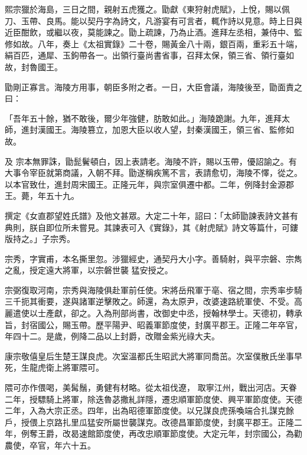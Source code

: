 \begin{pinyinscope}
 熙宗獵於海島，三日之間，親射五虎獲之。勖獻《東狩射虎賦》，上悅，賜以佩
 刀、玉帶、良馬。能以契丹字為詩文，凡游宴有可言者，輒作詩以見意。時上日與近臣酣飲，或繼以夜，莫能諫之。勖上疏諫，乃為止酒。進拜左丞相，兼侍中、監修如故。八年，奏上《太祖實錄》二十卷，賜黃金八十兩，銀百兩，重彩五十端，絹百匹，通犀、玉鉤帶各一。出領行臺尚書省事，召拜太保，領三省、領行臺如故，封魯國王。



 勖剛正寡言。海陵方用事，朝臣多附之者。一日，大臣會議，海陵後至，勖面責之曰：



 「吾年五十餘，猶不敢後，爾少年強健，肪敢如此。」海陵跪謝。九年，進拜太師，進封漢國王。海陵篡立，加恩大臣以收人望，封秦漢國王，領三省、監修如故。



 及
 宗本無罪誅，勖髭鬢頓白，因上表請老。海陵不許，賜以玉帶，優詔諭之。有大事令宰臣就第商議，入朝不拜。勖遂稱疾篤不言，表請愈切，海陵不懌，從之。以本官致仕，進封周宋國王。正隆元年，與宗室俱遷中都。二年，例降封金源郡王。薨，年五十九。



 撰定《女直郡望姓氏譜》及他文甚眾。大定二十年，詔曰：「太師勖諫表詩文甚有典則，朕自即位所未嘗見。其諫表可入《實錄》，其《射虎賦》詩文等篇什，可鏤版持之。」子宗秀。



 宗秀，字實甫，本名撕里忽。涉獵經史，通契丹大小字。善騎射，與平宗磐、宗雋之亂，授定遠大將軍，以宗磐世襲
 猛安授之。



 宗弼復取河南，宗秀與海陵俱赴軍前任使。宋將岳飛軍于亳、宿之間，宗秀率步騎三千扼其衝要，遂與諸軍逆擊敗之。師還，為太原尹，改婆速路統軍使、不受。高麗遣使以士產獻，卻之。入為刑部尚書，改御史中丞，授翰林學士。天德初，轉承旨，封宿國公，賜玉帶。歷平陽尹、昭義軍節度使，封廣平郡王。正隆二年卒官，年四十二。是歲，例降二品以上封爵，改贈金紫光祿大夫。



 康宗敬僖皇后生楚王謀良虎。次室溫都氏生昭武大將軍同喬茁。次室僕散氏坐事早死，生龍虎衛上將軍隈可。



 隈可亦作偎喝，美髯鬚，勇健有材略。從太祖伐遼，
 取寧江州，戰出河店。天眷二年，授驃騎上將軍，除迭魯苾撒糺詳隱，遷忠順軍節度使、興平軍節度使。天德二年，入為大宗正丞。四年，出為昭德軍節度使。以兄謀良虎孫喚端合扎謀克餘戶，授偎上京路扎里瓜猛安所屬世襲謀克。改德昌軍節度使，封廣平郡王。正隆二年，例奪王爵，改曷速館節度使，再改忠順軍節度使。大定元年，封宗國公，為勸農使，卒官，年六十五。




\end{pinyinscope}
